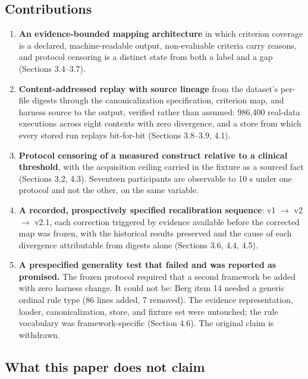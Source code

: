 \documentclass[11pt]{article}
\providecommand{\tightlist}{\setlength{\itemsep}{0pt}\setlength{\parskip}{0pt}}
\begin{document}
\subsection{Contributions}\label{contributions}

\begin{enumerate}
\def\labelenumi{\arabic{enumi}.}
\tightlist
\item
  \textbf{An evidence-bounded mapping architecture} in which criterion coverage is a declared, machine-readable output, non-evaluable criteria carry reasons, and protocol censoring is a distinct state from both a label and a gap (Sections 3.4--3.7).
\item
  \textbf{Content-addressed replay with source lineage} from the dataset's per-file digests through the canonicalization specification, criterion map, and harness source to the output, verified rather than assumed: 986,400 real-data executions across eight contexts with zero divergence, and a store from which every stored run replays bit-for-bit (Sections 3.8--3.9, 4.1).
\item
  \textbf{Protocol censoring of a measured construct relative to a clinical threshold}, with the acquisition ceiling carried in the fixture as a sourced fact (Sections 3.2, 4.3). Seventeen participants are observable to 10 s under one protocol and not the other, on the same variable.
\item
  \textbf{A recorded, prospectively specified recalibration sequence}: v1 $\rightarrow$ v2 $\rightarrow$ v2.1, each correction triggered by evidence available before the corrected map was frozen, with the historical results preserved and the cause of each divergence attributable from digests alone (Sections 3.6, 4.4, 4.5).
\item
  \textbf{A prespecified generality test that failed and was reported as promised.} The frozen protocol required that a second framework be added with zero harness change. It could not be: Berg item 14 needed a generic ordinal rule type (86 lines added, 7 removed). The evidence representation, loader, canonicalization, store, and fixture set were untouched; the rule vocabulary was framework-specific (Section 4.6). The original claim is withdrawn.
\end{enumerate}

\subsection{What this paper does not claim}\label{what-this-paper-does-not-claim}
\end{document}
